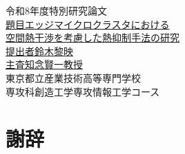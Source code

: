 \documentclass[uplatex,dvipdfmx,a4paper,11pt,report,openany]{jsbook}
\newcommand{\thesiskind}{特別研究論文}        %
\newcommand{\advisorlabel}{主査}             %
\newcommand{\coursename}{創造工学専攻\quad 情報工学コース} %
\begin{document}
\begin{titlepage}
  \begin{center}\LARGE
  \vspace*{1.0cm}
  令和8年度\quad \thesiskind\\
  \vspace{2.8cm}
  \underline{題目\quad エッジマイクロクラスタにおける}\\
  \underline{空間熱干渉を考慮した熱抑制手法の研究}\\
  \vspace{2.8cm}
  \underline{提出者\quad 鈴木\quad 黎映}\\
  \vspace{1.5cm}
  \underline{\advisorlabel\quad 知念\quad 賢一\quad 教授}\\
  \vspace{3.0cm}
  {\Large
  東京都立産業技術高等専門学校\\
  \vspace{0.3cm}
  専攻科\quad \coursename
  }
  \end{center}
\end{titlepage}

\frontmatter

\tableofcontents
\listoffigures
\listoftables

\mainmatter










\backmatter
\chapter*{謝辞}

\nocite{*} %


\end{document}
